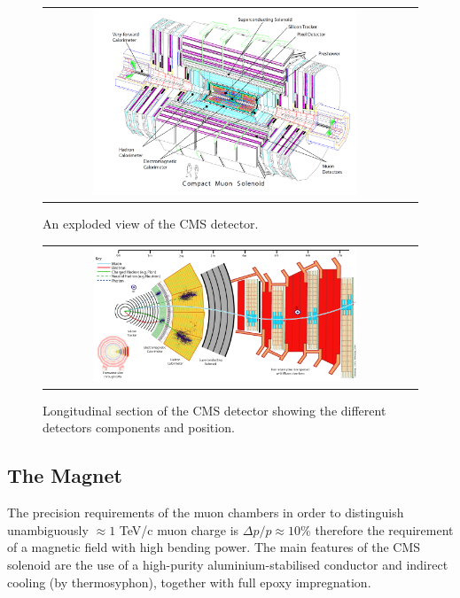 \begin{figure}[tbh!]
	\centering
	\begin{tabular}{cc}
		\includegraphics[width=0.75\textwidth]{detector/pics/CMS_apparatus.png}
	\end{tabular}
	\caption{An exploded view of the CMS detector.}
	\label{fig:CMS_apparatus}
\end{figure}

\begin{figure}[tbh!]
	\centering
	\begin{tabular}{cc}
		\includegraphics[width=0.75\textwidth]{detector/pics/CMS_slice.png}
	\end{tabular}
	\caption{Longitudinal section of the CMS detector showing the different detectors components and position.}
	\label{fig:CMS_slice}
\end{figure}

\clearpage

\subsection{The Magnet}

The precision requirements of the muon chambers in order to distinguish unambiguously $\approx 1$ TeV/c muon charge is $\Delta p / p \approx 10\%$ therefore the requirement of a magnetic field with high bending power. The main features of the CMS solenoid are the use of a high-purity aluminium-stabilised conductor and indirect cooling (by thermosyphon), together with full epoxy impregnation.

